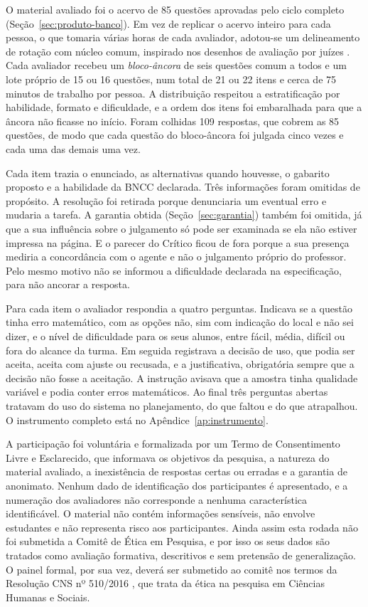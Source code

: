 O material avaliado foi o acervo de 85 questões aprovadas pelo ciclo completo
(Seção~\ref{sec:produto-banco}). Em vez de replicar o acervo inteiro para cada pessoa, o que
tomaria várias horas de cada avaliador, adotou-se um delineamento de rotação com núcleo comum,
inspirado nos desenhos de avaliação por juízes \citep{streiner2015health}. Cada avaliador recebeu
um \emph{bloco-âncora} de seis questões comum a todos e um lote próprio de 15 ou 16 questões, num
total de 21 ou 22 itens e cerca de 75 minutos de trabalho por pessoa. A distribuição respeitou a
estratificação por habilidade, formato e dificuldade, e a ordem dos itens foi embaralhada para que
a âncora não ficasse no início. Foram colhidas 109 respostas, que cobrem as 85 questões, de modo que
cada questão do bloco-âncora foi julgada cinco vezes e cada uma das demais uma vez.

Cada item trazia o enunciado, as alternativas quando houvesse, o gabarito proposto e a habilidade
da BNCC declarada. Três informações foram omitidas de propósito. A resolução foi retirada porque
denunciaria um eventual erro e mudaria a tarefa. A garantia obtida (Seção~\ref{sec:garantia})
também foi omitida, já que a sua influência sobre o julgamento só pode ser examinada se ela não
estiver impressa na página. E o parecer do Crítico ficou de fora porque a sua presença mediria a
concordância com o agente e não o julgamento próprio do professor. Pelo mesmo motivo não se
informou a dificuldade declarada na especificação, para não ancorar a resposta.

Para cada item o avaliador respondia a quatro perguntas. Indicava se a questão tinha erro
matemático, com as opções não, sim com indicação do local e não sei dizer, e o nível de dificuldade
para os seus alunos, entre fácil, média, difícil ou fora do alcance da turma. Em seguida registrava
a decisão de uso, que podia ser aceita, aceita com ajuste ou recusada, e a justificativa, obrigatória
sempre que a decisão não fosse a aceitação. A instrução avisava que a amostra tinha qualidade
variável e podia conter erros matemáticos. Ao final três perguntas abertas tratavam do uso do sistema
no planejamento, do que faltou e do que atrapalhou. O instrumento completo está no
Apêndice~\ref{ap:instrumento}.

A participação foi voluntária e formalizada por um Termo de Consentimento Livre e Esclarecido, que
informava os objetivos da pesquisa, a natureza do material avaliado, a inexistência de respostas
certas ou erradas e a garantia de anonimato. Nenhum dado de identificação dos participantes é
apresentado, e a numeração dos avaliadores não corresponde a nenhuma característica identificável.
O material não contém informações sensíveis, não envolve estudantes e não representa risco aos
participantes. Ainda assim esta rodada não foi submetida a Comitê de Ética em Pesquisa, e por isso os
seus dados são tratados como avaliação formativa, descritivos e sem pretensão de generalização. O
painel formal, por sua vez, deverá ser submetido ao comitê nos termos da Resolução CNS nº 510/2016
\citep{brasil2016resolucao510}, que trata da ética na pesquisa em Ciências Humanas e Sociais.

